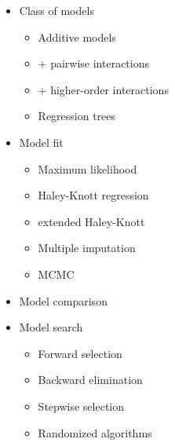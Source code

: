 \documentclass[12pt]{article}
\newcommand{\smallestsize}{\fontsize{18}{22} \selectfont}
\begin{document}
\hspace{0.5in}
\begin{minipage}[t]{4in}
\vspace*{0mm}

\begin{itemize}
\item Class of models
{\smallestsize \color{myblue} \begin{itemize}
\item Additive models
\item + pairwise interactions
\item + higher-order interactions
\item Regression trees
\end{itemize} }

\vspace{15mm}

\item Model fit
{\smallestsize \color{myblue} \begin{itemize}
\item Maximum likelihood
\item Haley-Knott regression
\item extended Haley-Knott
\item Multiple imputation
\item MCMC
\end{itemize} }

\end{itemize}

\end{minipage} \hspace{1in}
\begin{minipage}[t]{4in}
\vspace*{0mm}

\begin{itemize}
\item Model comparison
{\smallestsize \color{myblue}  }

\vspace{15mm}


\item Model search
{\smallestsize \color{myblue} \begin{itemize}
\item Forward selection
\item Backward elimination
\item Stepwise selection
\item Randomized algorithms
\end{itemize} }


\end{itemize}

\end{minipage}
\end{document}
